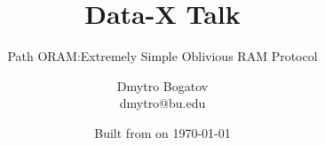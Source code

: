 

\ifnotes%
\fi

\title{Data-X Talk} %

\subtitle{Path ORAM:\@An Extremely Simple Oblivious RAM Protocol}

\date{Built from \href{https://git.dbogatov.org/bu/PathORAM-Talk/commit/\version}{\emph{\version}} on \today}

\author{Dmytro Bogatov \\ dmytro@bu.edu}



\makeatletter
\def\beamer@framenotesbegin{%
	\usebeamercolor[fg]{normal text} 
		\gdef\beamer@noteitems{}%
		\gdef\beamer@notes{}%
}
\makeatother


\newcommand{\BigO}[1]{\mathcal{O}\left(#1\right)}
\newcommand{\RAM}{\textbf{RAM}}
